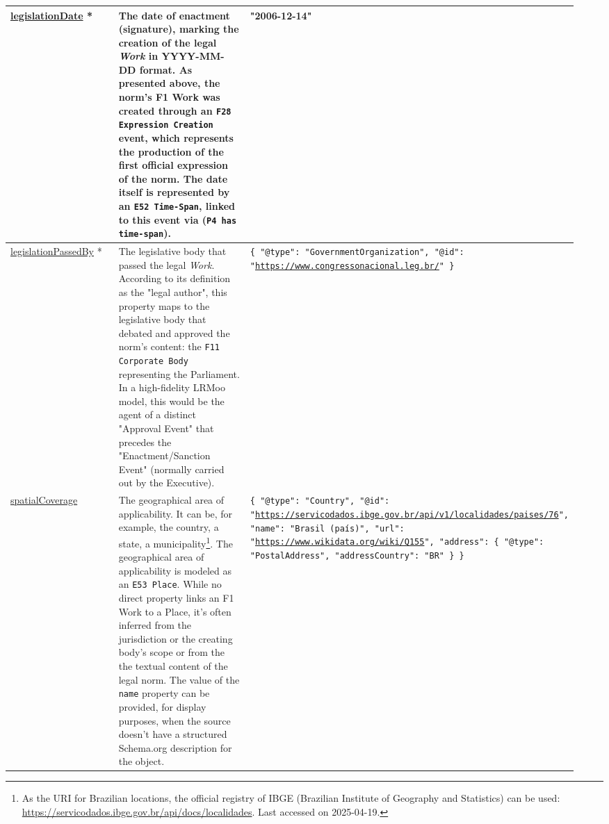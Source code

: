 \documentclass[11pt]{article}
\begin{document}
\begin{longtable}{p{0.25\linewidth} p{0.35\linewidth} p{0.35\linewidth}}
\url{legislationDate} * & The date of enactment (signature), marking the creation of the legal \emph{Work} in YYYY-MM-DD format. \newline As presented above, the norm's F1 Work was created through an \texttt{F28 Expression Creation} event, which represents the production of the first official expression of the norm. The date itself is represented by an \texttt{E52 Time-Span}, linked to this event via (\texttt{P4 has time-span}). & "2006-12-14" \\
\midrule

\url{legislationPassedBy} * & The legislative body that passed the legal \emph{Work}. \newline According to its definition as the "legal author", this property maps to the legislative body that debated and approved the norm's content: the \texttt{F11 Corporate Body} representing the Parliament. In a high-fidelity LRMoo model, this would be the agent of a distinct "Approval Event" that precedes the "Enactment/Sanction Event" (normally carried out by the Executive). & \texttt{\{ "@type": "GovernmentOrganization", "@id": "\url{https://www.congressonacional.leg.br/}" \}} \\
\midrule

\url{spatialCoverage} & The geographical area of applicability. It can be, for example, the country, a state, a municipality\footnote{As the URI for Brazilian locations, the official registry of IBGE (Brazilian Institute of Geography and Statistics) can be used: \url{https://servicodados.ibge.gov.br/api/docs/localidades}. Last accessed on 2025-04-19.}. The geographical area of applicability is modeled as an \texttt{E53 Place}. While no direct property links an F1 Work to a Place, it's often inferred from the jurisdiction or the creating body's scope or from the the textual content of the legal norm. \newline The value of the \texttt{name} property can be provided, for display purposes, when the source doesn't have a structured Schema.org description for the object. & \texttt{\{ "@type": "Country", "@id": "\url{https://servicodados.ibge.gov.br/api/v1/localidades/paises/76}", "name": "Brasil (país)", "url": "\url{https://www.wikidata.org/wiki/Q155}", "address": \{ "@type": "PostalAddress", "addressCountry": "BR" \} \}} \\
\midrule


\end{longtable}
\end{document}
